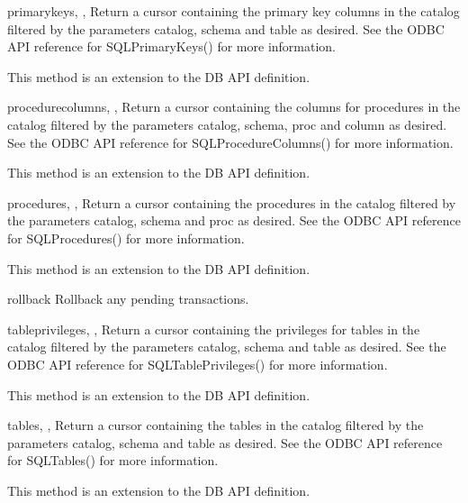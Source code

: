 \documentclass{manual}
\begin{document}
\begin{funcdesc}{primarykeys}{, ,
    }
  Return a cursor containing the primary key columns in the catalog filtered by
  the parameters catalog, schema and table as desired. See the ODBC API
  reference for SQLPrimaryKeys() for more information.

   This method is an extension to the DB API definition.
\end{funcdesc}

\begin{funcdesc}{procedurecolumns}{, ,
     }
  Return a cursor containing the columns for procedures in the catalog filtered
  by the parameters catalog, schema, proc and column as desired. See the ODBC
  API reference for SQLProcedureColumns() for more information.

   This method is an extension to the DB API definition.
\end{funcdesc}

\begin{funcdesc}{procedures}{, ,
    }
  Return a cursor containing the procedures in the catalog filtered by the
  parameters catalog, schema and proc as desired. See the ODBC API reference
  for SQLProcedures() for more information.

   This method is an extension to the DB API definition.
\end{funcdesc}

\begin{funcdesc}{rollback}{}
  Rollback any pending transactions.
\end{funcdesc}

\begin{funcdesc}{tableprivileges}{, ,
    }
  Return a cursor containing the privileges for tables in the catalog filtered
  by the parameters catalog, schema and table as desired. See the ODBC API
  reference for SQLTablePrivileges() for more information.

   This method is an extension to the DB API definition.
\end{funcdesc}

\begin{funcdesc}{tables}{, ,
    }
  Return a cursor containing the tables in the catalog filtered by the
  parameters catalog, schema and table as desired. See the ODBC API reference
  for SQLTables() for more information.

   This method is an extension to the DB API definition.
\end{funcdesc}
\end{document}
